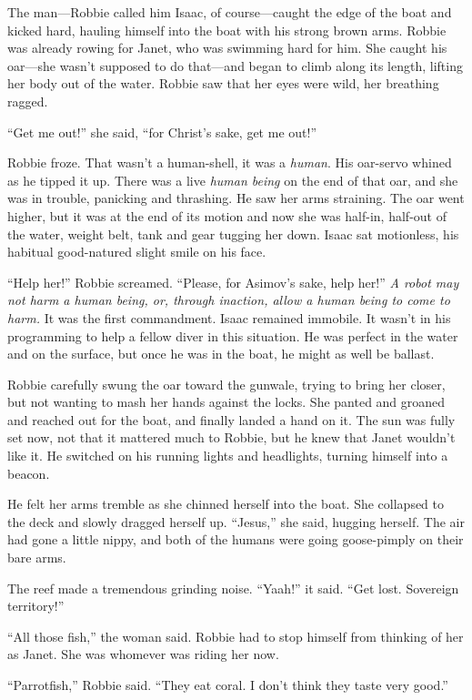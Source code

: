 The man—Robbie called him Isaac, of course—caught the edge of the
boat and kicked hard, hauling himself into the boat with his strong
brown arms. Robbie was already rowing for Janet, who was swimming
hard for him. She caught his oar—she wasn’t supposed to do that—and
began to climb along its length, lifting her body out of the water.
Robbie saw that her eyes were wild, her breathing ragged.

“Get me out!” she said, “for Christ’s sake, get me out!”

Robbie froze. That wasn’t a human-shell, it was a \emph{human}. His
oar-servo whined as he tipped it up. There was a live
\emph{human being} on the end of that oar, and she was in trouble,
panicking and thrashing. He saw her arms straining. The oar went
higher, but it was at the end of its motion and now she was
half-in, half-out of the water, weight belt, tank and gear tugging
her down. Isaac sat motionless, his habitual good-natured slight
smile on his face.

“Help her!” Robbie screamed. “Please, for Asimov’s sake, help her!”
\emph{A robot may not harm a human being, or, through inaction, allow a human being to come to harm.}
It was the first commandment. Isaac remained immobile. It wasn’t in
his programming to help a fellow diver in this situation. He was
perfect in the water and on the surface, but once he was in the
boat, he might as well be ballast.

Robbie carefully swung the oar toward the gunwale, trying to bring
her closer, but not wanting to mash her hands against the locks.
She panted and groaned and reached out for the boat, and finally
landed a hand on it. The sun was fully set now, not that it
mattered much to Robbie, but he knew that Janet wouldn’t like it.
He switched on his running lights and headlights, turning himself
into a beacon.

He felt her arms tremble as she chinned herself into the boat. She
collapsed to the deck and slowly dragged herself up. “Jesus,” she
said, hugging herself. The air had gone a little nippy, and both of
the humans were going goose-pimply on their bare arms.

The reef made a tremendous grinding noise. “Yaah!” it said. “Get
lost. Sovereign territory!”

“All those fish,” the woman said. Robbie had to stop himself from
thinking of her as Janet. She was whomever was riding her now.

“Parrotfish,” Robbie said. “They eat coral. I don’t think they
taste very good.”

